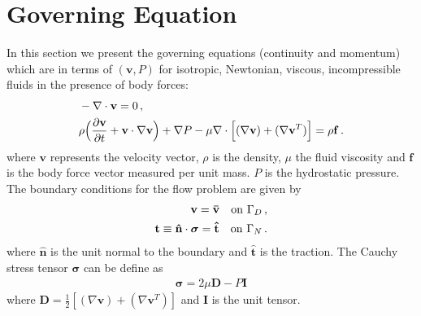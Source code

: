 \documentclass[]{article}
\begin{document}
\section{Governing Equation} \label{sec: GE} 
In this section we present the governing equations (continuity and momentum) which are in terms of $(\mathbf{v}, P)$ for isotropic, Newtonian, viscous, incompressible fluids in the presence of body forces:
\begin{equation}\label{eq1}
	\begin{aligned}
		&-\nabla \cdot \mathbf{v} = 0\thinspace,\\
		&\rho \Big( \frac{\partial \mathbf{v}}{\partial t } + \mathbf{v} \cdot \nabla \mathbf{v} \Big) + \nabla P - \mu \nabla \cdot \Big[(\nabla \mathbf{v}) + (\nabla \mathbf{v}^T)  \Big]= \rho \mathbf{f}\thinspace.
	\end{aligned}
\end{equation}
where $\mathbf{v}$ represents the velocity vector, $\rho$ is the density, $\mu$ the fluid viscosity and $\mathbf{f}$ is the body force vector measured per unit mass. $P$ is the hydrostatic pressure. The boundary conditions for the flow problem are
given by
\begin{equation}\label{eq2}
	\begin{aligned}
		\mathbf{v} = \mathbf{\bar{v}} \quad \mathrm{on} \ \Gamma_D\thinspace,\\
		\mathbf{t} \equiv \mathbf{\hat{n}} \cdot \boldsymbol{\sigma} = \mathbf{\hat{t}} \quad \mathrm{on} \ \Gamma_N\thinspace.
	\end{aligned}
\end{equation}
where $\mathbf{\hat{n}}$ is the unit normal to the boundary and $\mathbf{\hat{t}}$ is the traction.  The Cauchy stress tensor $\boldsymbol{\sigma}$ can be define as 
\begin{equation}\label{eq3}
	\begin{aligned}
		\boldsymbol{\sigma} = 2\mu \mathbf{D} - P \mathbf{I}
	\end{aligned}
\end{equation}
where $\mathbf{D} = \frac{1}{2} [(\nabla \mathbf{v}) + (\nabla \mathbf{v}^T)]$ and $\mathbf{I}$ is the unit tensor.
\end{document}
